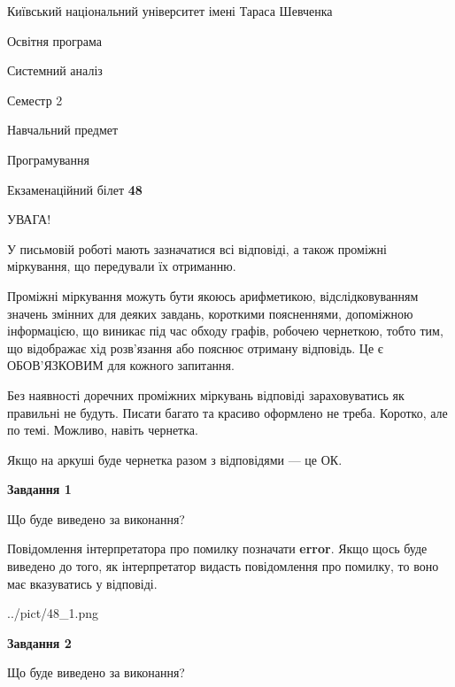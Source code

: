 \documentclass[12pt, ukrainian]{article}
\begin{document}
{{\begin {small}\par
{ \center  Київський національний університет імені Тараса Шевченка \par}
{\parbox {5 cm}{Освітня програма \hfill}{\parbox {7 cm}{Системний аналіз \hfill}}\parbox {6 cm}{\hfill Семестр 2}}\par
{\parbox {5 cm} {Навчальний предмет \hfill}\parbox {7 cm}{Програмування \hfill}\parbox {6cm}{\hfill}\par}\vspace{-7pt} \end{small}}{\center Екзаменаційний білет \No \textbf
{ 48 }\par}}
{
\begin {large}
УВАГА!

У письмовій роботі мають зазначатися всі відповіді, а також проміжні міркування, що передували їх отриманню.

Проміжні міркування можуть бути якоюсь арифметикою, відслідковуванням зна\-чень змінних для деяких завдань,
короткими поясненнями, допоміжною інформацією, що виникає під час обходу графів, робочею чернеткою,
тобто тим, що відображає хід розв’язання або пояснює отриману відповідь.
Це є ОБОВ’ЯЗКОВИМ для кожного запитання.

Без наявності доречних проміжних міркувань відповіді зараховуватись як правиль\-ні не будуть.
Писати багато та красиво оформлено не треба. Коротко, але по темі. Можли\-во, навіть чернетка.

Якщо на аркуші буде чернетка разом з відповідями --- це ОК.

\newpage

{\begin {center}\textbf{Завдання 1}\end {center}}\par
Що буде виведено за виконання?

Повідомлення інтерпретатора про помилку позначати \textbf{error}.
Якщо щось буде виведено до того, як інтерпретатор видасть повідомлення про помилку, 
то воно має вказуватись у відповіді. \par


\begin{center}
	{../pict/48_1.png}
\end{center}
\newpage

{\begin {center}\textbf{Завдання 2}\end {center}}\par
Що буде виведено за виконання?


\end{large}}
\end{document}
